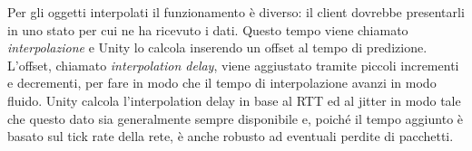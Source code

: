 Per gli oggetti interpolati il funzionamento è diverso: il client dovrebbe presentarli in uno stato per cui ne ha ricevuto i dati. Questo tempo viene chiamato \emph{interpolazione} e Unity lo calcola inserendo un offset al tempo di predizione. L'offset, chiamato \emph{interpolation delay}, viene aggiustato tramite piccoli incrementi e decrementi, per fare in modo che il tempo di interpolazione avanzi in modo fluido. Unity calcola l'interpolation delay in base al RTT ed al jitter in modo tale che questo dato sia generalmente sempre disponibile e, poiché il tempo aggiunto è basato sul tick rate della rete, è anche robusto ad eventuali perdite di pacchetti.
